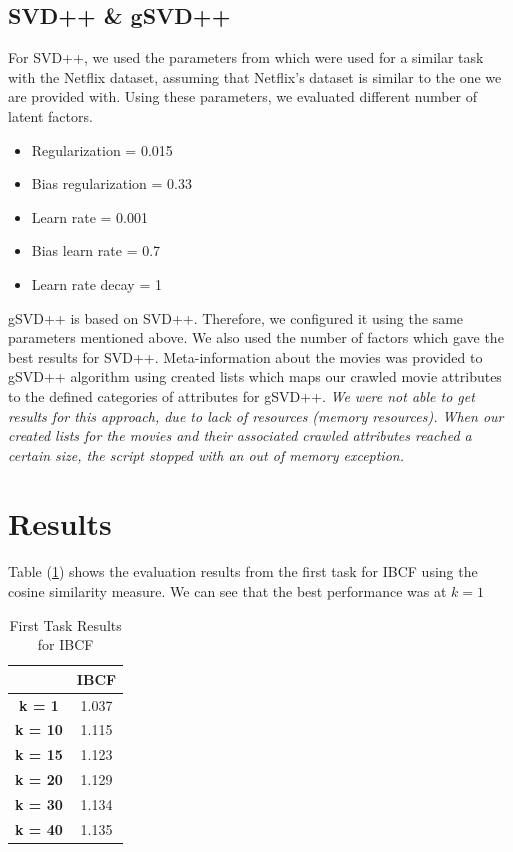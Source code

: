 \documentclass{sigish}
\begin{document}
\subsection{SVD++ \& gSVD++}
For SVD++, we used the parameters from \cite{Koren:2009} which were used for a similar task with the Netflix dataset, assuming that Netflix's dataset is similar to the one we are provided with. Using these parameters, we evaluated different number of latent factors.
\begin{itemize}
\item Regularization = 0.015
\item Bias regularization = 0.33
\item Learn rate = 0.001
\item Bias learn rate = 0.7
\item Learn rate decay = 1
\end{itemize}

gSVD++ is based on SVD++. Therefore, we configured it using the same parameters mentioned above. We also used the number of factors which gave the best results for SVD++. Meta-information about the movies was provided to gSVD++ algorithm using created lists which maps our crawled movie attributes to the defined categories of attributes for gSVD++.
\emph{We were not able to get results for this approach, due to lack of resources (memory resources). When our created lists for the movies and their associated crawled attributes reached a certain size, the script stopped with an out of memory exception.}

\section{Results}
\label{sec:results}
Table (\ref{tab:eval_00}) shows the evaluation results from the first task for IBCF using the cosine similarity measure. We can see that the best performance was at $ k = 1 $

\begin{table}[]
\centering
\begin{tabular}{|c|c|}
\hline
                & \textbf{IBCF} \\ \hline
\textbf{k = 1}  & 1.037         \\ \hline
\textbf{k = 10} & 1.115         \\ \hline
\textbf{k = 15} & 1.123         \\ \hline
\textbf{k = 20} & 1.129         \\ \hline
\textbf{k = 30} & 1.134         \\ \hline
\textbf{k = 40} & 1.135         \\ \hline
\end{tabular}
\caption{First Task Results for IBCF}
\label{tab:eval_00}
\end{table}
\end{document}
